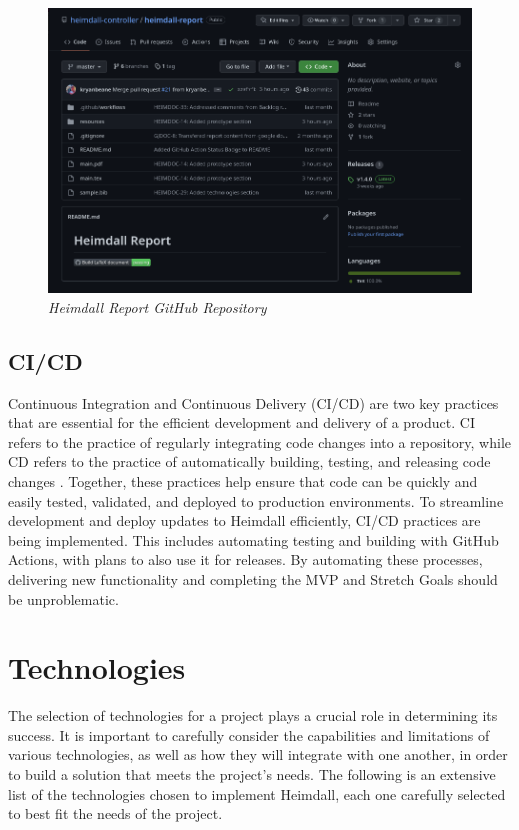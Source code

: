 \documentclass{article}
\begin{document}
\begin{figure}[H]
    \centering
    \includegraphics[width=120mm]{methodology/github.png}
    \caption{\emph{Heimdall Report GitHub Repository}}
    \label{github}
\end{figure}



\subsection{CI/CD} \label{cicd}

Continuous Integration and Continuous Delivery (CI/CD) are two key practices that are essential for the efficient development and delivery of a product. CI refers to the practice of regularly integrating code changes into a repository, while CD refers to the practice of automatically building, testing, and releasing code changes \cite{ci-cd}. Together, these practices help ensure that code can be quickly and easily tested, validated, and deployed to production environments. To streamline development and deploy updates to Heimdall efficiently, CI/CD practices are being implemented. This includes automating testing and building with GitHub Actions, with plans to also use it for releases. By automating these processes, delivering new functionality and completing the MVP and Stretch Goals should be unproblematic.


\section{Technologies} \label{technologies} 

The selection of technologies for a project plays a crucial role in determining its success. It is important to carefully consider the capabilities and limitations of various technologies, as well as how they will integrate with one another, in order to build a solution that meets the project's needs. The following is an extensive list of the technologies chosen to implement Heimdall, each one carefully selected to best fit the needs of the project.
\end{document}
